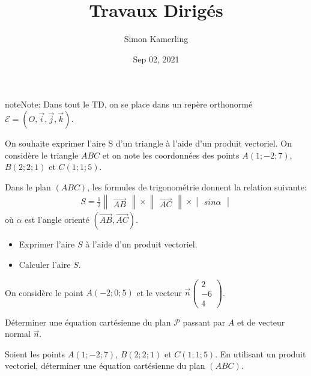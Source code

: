 \documentclass[letterpaper,10pt,english]{jupyterBook}
\title{Travaux Dirigés}
\date{Sep 02, 2021}
\author{Simon Kamerling}
\begin{document}
\pagestyle{empty}
\sphinxmaketitle
\pagestyle{plain}
\sphinxtableofcontents
\pagestyle{normal}
\label{\detokenize{Part1/TD::doc}}


\begin{sphinxadmonition}{note}{Note:}
\sphinxAtStartPar
Dans tout le TD, on se place dans un repère orthonormé \(\mathcal{E} = (O,\vec{i},\vec{j},\vec{k})\).
\end{sphinxadmonition}

\sphinxAtStartPar
{} On souhaite exprimer l’aire S d’un triangle à l’aide d’un produit vectoriel. On considère le triangle \(ABC\) et on note les coordonnées des points \(A(1;-2;7)\), \(B(2;2;1)\) et \(C(1;1;5)\).

\sphinxAtStartPar
Dans le plan \((ABC)\), les formules de trigonométrie donnent la relation suivante:
\begin{equation*}
\begin{split}
S=\frac{1}{2}\begin{Vmatrix}\vec{AB}\end{Vmatrix} \times \begin{Vmatrix}\vec{AC}\end{Vmatrix} \times \begin{vmatrix}sin\alpha\end{vmatrix}
\end{split}
\end{equation*}
\sphinxAtStartPar
où \(\alpha\) est l’angle orienté \((\vec{AB},\vec{AC})\).
\begin{itemize}
\item {} 
\sphinxAtStartPar
Exprimer l’aire \(S\) à l’aide d’un produit vectoriel.

\item {} 
\sphinxAtStartPar
Calculer l’aire \(S\).

\end{itemize}

\sphinxAtStartPar
{} On considère le point \(A(-2;0;5)\) et le vecteur \(\vec{n}\begin{pmatrix}
2\\-6\\4
\end{pmatrix}\).

\sphinxAtStartPar
Déterminer une équation cartésienne du plan \(\mathcal{P}\) passant par \(A\) et de vecteur normal \(\vec{n}\).

\sphinxAtStartPar
{} Soient les points \(A(1;-2;7)\), \(B(2;2;1)\) et \(C(1;1;5)\). En utilisant un produit vectoriel, déterminer une équation cartésienne du plan \((ABC)\).
\end{document}
